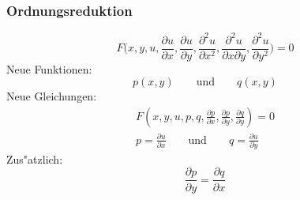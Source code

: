 \documentclass{beamer}
\begin{document}
\begin{frame}
\frametitle{Ordnungsreduktion}
\[
F\biggl(x,y,u,
\frac{\partial u}{\partial x},
\frac{\partial u}{\partial y},
\frac{\partial^2 u}{\partial x^2},
\frac{\partial^2 u}{\partial x\partial y},
\frac{\partial^2 u}{\partial y^2}
\biggr)=0
\]
\pause
Neue Funktionen:
\[
p(x,y)\qquad\text{und}\qquad q(x,y)
\]
\pause
Neue Gleichungen:
\begin{gather*}
F(x,y,u,p,q,\frac{\partial p}{\partial x},\frac{\partial p}{\partial y},
\frac{\partial q}{\partial y})=0
\\
p=\frac{\partial u}{\partial x}\qquad\text{und}\qquad
q=\frac{\partial u}{\partial y}
\end{gather*}
\pause
Zus"atzlich:
\[
\frac{\partial p}{\partial y}=\frac{\partial q}{\partial x}
\]
\end{frame}
\end{document}

